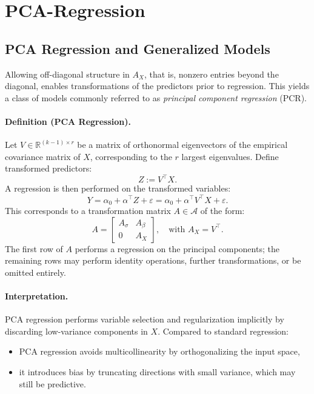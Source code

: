 \section{PCA-Regression}


\subsection{PCA Regression and Generalized Models}

Allowing off-diagonal structure in $A_X$, that is, nonzero entries beyond the diagonal, enables transformations of the predictors prior to regression. This yields a class of models commonly referred to as \emph{principal component regression} (PCR).

\paragraph{Definition (PCA Regression).}
Let $V \in \mathbb{R}^{(k-1) \times r}$ be a matrix of orthonormal eigenvectors of the empirical covariance matrix of $X$, corresponding to the $r$ largest eigenvalues. Define transformed predictors:
\[
Z := V^\top X.
\]
A regression is then performed on the transformed variables:
\[
Y = \alpha_0 + \alpha^\top Z + \varepsilon = \alpha_0 + \alpha^\top V^\top X + \varepsilon.
\]
This corresponds to a transformation matrix $A \in \mathcal{A}$ of the form:
\[
A = 
\begin{bmatrix}
A_\sigma & A_\beta \\
0 & A_X
\end{bmatrix}, \quad \text{with } A_X = V^\top.
\]
The first row of $A$ performs a regression on the principal components; the remaining rows may perform identity operations, further transformations, or be omitted entirely.

\paragraph{Interpretation.}
PCA regression performs variable selection and regularization implicitly by discarding low-variance components in $X$. Compared to standard regression:
\begin{itemize}
    \item PCA regression avoids multicollinearity by orthogonalizing the input space,
    \item it introduces bias by truncating directions with small variance, which may still be predictive.
\end{itemize}



